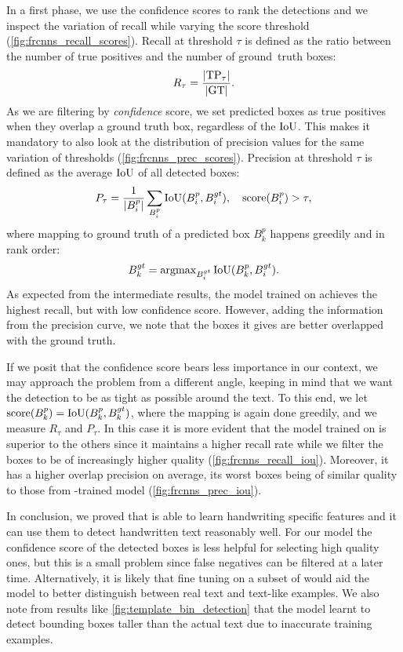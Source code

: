 	In a first phase, we use the confidence scores to rank the detections and we inspect the variation of recall while varying the score threshold (\autoref{fig:frcnns_recall_scores}). Recall at threshold \(\tau\) is defined as the ratio between the number of true positives and the number of \mbox{ground truth} boxes:
	\[
		R_{\tau} = \frac{\left\vert\operatorname{TP}_\tau\right\vert}{\left\vert\operatorname{GT}\right\vert}.
	\]
	As we are filtering by \emph{confidence} score, we set predicted boxes as true positives when they overlap a ground truth box, regardless of the \(\operatorname{IoU}\). This makes it mandatory to also look at the distribution of precision values for the same variation of thresholds (\autoref{fig:frcnns_prec_scores}). Precision at threshold \(\tau\) is defined as the average \(\operatorname{IoU}\) of all detected boxes:
	\[
			P_\tau = \frac{1}{\left\vert B^p_i\right\vert} \sum_{B^p_{i}} \operatorname{IoU}(B^p_i, B^{gt}_i),~~~\operatorname{score}(B^p_i ) > \tau,
	\]
	where mapping to ground truth of a predicted box \(B^p_k\) happens greedily and in rank order:
	\[
			B^{gt}_k = \operatorname{argmax}_{B^{gt}_i} \operatorname{IoU}(B^p_k, B^{gt}_i).
	\]
	As expected from the intermediate results, the model trained on  achieves the highest recall, but with low confidence score. However, adding the information from the precision curve, we note that the boxes it gives are better overlapped with the ground truth.

	If we posit that the confidence score bears less importance in our context, we may approach the problem from a different angle, keeping in mind that we want the detection to be as tight as possible around the text. To this end, we let \(\operatorname{score}(B^p_k) = \operatorname{IoU}(B^p_k, B^{gt}_k)\), where the mapping is again done greedily, and we measure \(R_\tau\) and \(P_\tau\). In this case it is more evident that the model trained on  is superior to the others since it maintains a higher recall rate while we filter the boxes to be of increasingly higher quality (\autoref{fig:frcnns_recall_iou}). Moreover, it has a higher overlap precision on average, its worst boxes being of similar quality to those from -trained model (\autoref{fig:frcnns_prec_iou}).

	In conclusion, we proved that \FRCNN{} is able to learn handwriting specific features and it can use them to detect handwritten text reasonably well. For our model the confidence score of the detected boxes is less helpful for selecting high quality ones, but this is a small problem since false negatives can be filtered at a later time. Alternatively, it is likely that fine tuning on a subset of  would aid the model to better distinguish between real text and text-like examples. We also note from results like \autoref{fig:template_bin_detection} that the model learnt to detect bounding boxes taller than the actual text due to inaccurate training examples.

